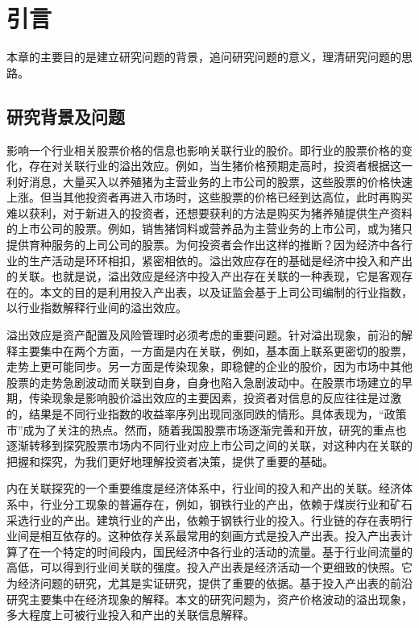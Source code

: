 \documentclass{sysuthesis}
\title{}%
\author{李俊成}%
\date{二〇一六年五月}%
\begin{document}
\frontmatter
\cleardoublepage
\tableofcontents%
\cleardoublepage
\listoftables%
\cleardoublepage
\listoffigures%

\mainmatter
\chapter{引言}
本章的主要目的是建立研究问题的背景，追问研究问题的意义，理清研究问题的思路。
\section{研究背景及问题}

影响一个行业相关股票价格的信息也影响关联行业的股价。即行业的股票价格的变化，存在对关联行业的溢出效应。例如，当生猪价格预期走高时，投资者根据这一利好消息，大量买入以养殖猪为主营业务的上市公司的股票，这些股票的价格快速上涨。但当其他投资者再进入市场时，这些股票的价格已经到达高位，此时再购买难以获利，对于新进入的投资者，还想要获利的方法是购买为猪养殖提供生产资料的上市公司的股票。例如，销售猪饲料或营养品为主营业务的上市公司，或为猪只提供育种服务的上司公司的股票。为何投资者会作出这样的推断？因为经济中各行业的生产活动是环环相扣，紧密相依的。溢出效应存在的基础是经济中投入和产出的关联。也就是说，溢出效应是经济中投入产出存在关联的一种表现，它是客观存在的。本文的目的是利用投入产出表，以及证监会基于上司公司编制的行业指数，以行业指数解释行业间的溢出效应。

溢出效应是资产配置及风险管理时必须考虑的重要问题。针对溢出现象，前沿的解释主要集中在两个方面，一方面是内在关联，例如，基本面上联系更密切的股票，走势上更可能同步。另一方面是传染现象，即稳健的企业的股价，因为市场中其他股票的走势急剧波动而关联到自身，自身也陷入急剧波动中。在股票市场建立的早期，传染现象是影响股价溢出效应的主要因素，投资者对信息的反应往往是过激的，结果是不同行业指数的收益率序列出现同涨同跌的情形。具体表现为，“政策市”成为了关注的热点。然而，随着我国股票市场逐渐完善和开放，研究的重点也逐渐转移到探究股票市场内不同行业对应上市公司之间的关联，对这种内在关联的把握和探究，为我们更好地理解投资者决策，提供了重要的基础。

内在关联探究的一个重要维度是经济体系中，行业间的投入和产出的关联。经济体系中，行业分工现象的普遍存在，例如，钢铁行业的产出，依赖于煤炭行业和矿石采选行业的产出。建筑行业的产出，依赖于钢铁行业的投入。行业链的存在表明行业间是相互依存的。这种依存关系最常用的刻画方式是投入产出表。投入产出表计算了在一个特定的时间段内，国民经济中各行业的活动的流量。基于行业间流量的高低，可以得到行业间关联的强度。投入产出表是经济活动一个更细致的快照。它为经济问题的研究，尤其是实证研究，提供了重要的依据。基于投入产出表的前沿研究主要集中在经济现象的解释。本文的研究问题为，资产价格波动的溢出现象，多大程度上可被行业投入和产出的关联信息解释。
\end{document}
